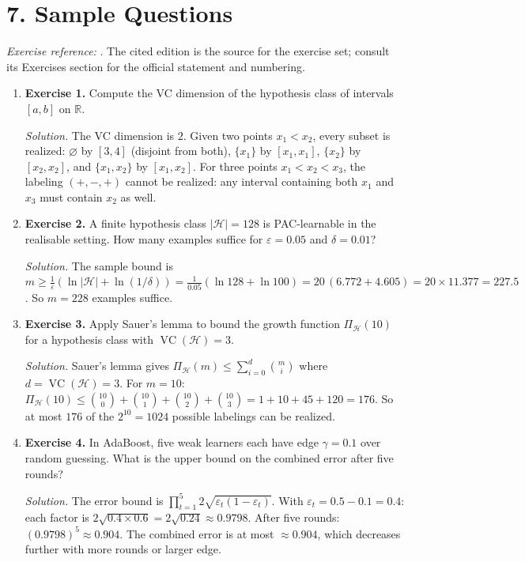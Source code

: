 \section*{7. Sample Questions}
\emph{Exercise reference:} \cite{colt_ref2}. The cited edition is the source for the exercise set; consult its Exercises section for the official statement and numbering.
\begin{enumerate}[leftmargin=*,itemsep=0.9em]
\item \textbf{Exercise 1.} Compute the VC dimension of the hypothesis class of intervals $[a,b]$ on $\mathbb{R}$.

\emph{Solution.} The VC dimension is $2$. Given two points $x_1<x_2$, every subset is realized: $\varnothing$ by $[3,4]$ (disjoint from both), $\{x_1\}$ by $[x_1,x_1]$, $\{x_2\}$ by $[x_2,x_2]$, and $\{x_1,x_2\}$ by $[x_1,x_2]$. For three points $x_1<x_2<x_3$, the labeling $(+, -,+)$ cannot be realized: any interval containing both $x_1$ and $x_3$ must contain $x_2$ as well.

\item \textbf{Exercise 2.} A finite hypothesis class $|\mathcal H|=128$ is PAC-learnable in the realisable setting. How many examples suffice for $\varepsilon=0.05$ and $\delta=0.01$?

\emph{Solution.} The sample bound is $m\geq\frac{1}{\varepsilon}(\ln|\mathcal H|+\ln(1/\delta))=\frac{1}{0.05}(\ln 128+\ln 100)=20\,(6.772+4.605)=20\times11.377=227.5$. So $m=228$ examples suffice.

\item \textbf{Exercise 3.} Apply Sauer's lemma to bound the growth function $\Pi_{\mathcal H}(10)$ for a hypothesis class with $\operatorname{VC}(\mathcal H)=3$.

\emph{Solution.} Sauer's lemma gives $\Pi_{\mathcal H}(m)\leq\sum_{i=0}^{d}\binom{m}{i}$ where $d=\operatorname{VC}(\mathcal H)=3$. For $m=10$: $\Pi_{\mathcal H}(10)\leq\binom{10}{0}+\binom{10}{1}+\binom{10}{2}+\binom{10}{3}=1+10+45+120=176$. So at most $176$ of the $2^{10}=1024$ possible labelings can be realized.

\item \textbf{Exercise 4.} In AdaBoost, five weak learners each have edge $\gamma=0.1$ over random guessing. What is the upper bound on the combined error after five rounds?

\emph{Solution.} The error bound is $\prod_{t=1}^{5}2\sqrt{\varepsilon_t(1-\varepsilon_t)}$. With $\varepsilon_t=0.5-0.1=0.4$: each factor is $2\sqrt{0.4\times0.6}=2\sqrt{0.24}\approx0.9798$. After five rounds: $(0.9798)^5\approx0.904$. The combined error is at most $\approx 0.904$, which decreases further with more rounds or larger edge.


\end{enumerate}
